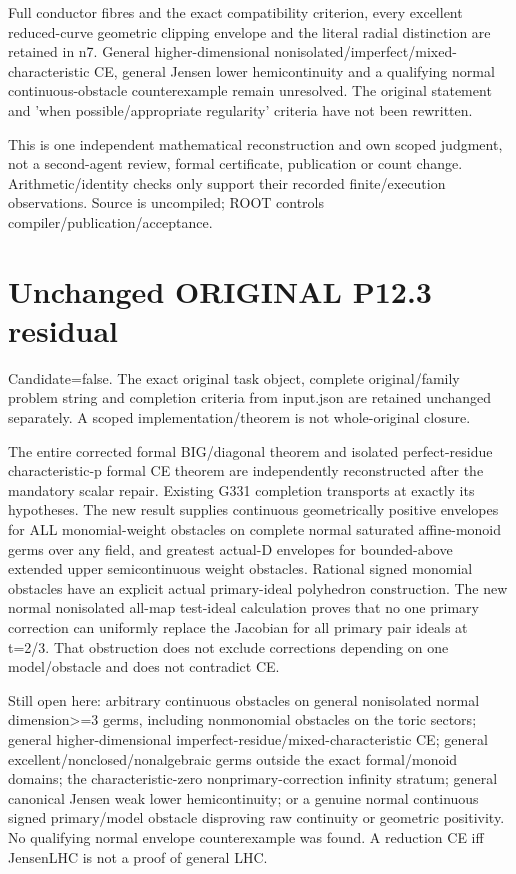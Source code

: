 \documentclass[11pt]{article}
\begin{document}
Full conductor fibres and the exact compatibility criterion, every excellent reduced-curve geometric clipping envelope and the literal radial distinction are retained in n7. General higher-dimensional nonisolated/imperfect/mixed-characteristic CE, general Jensen lower hemicontinuity and a qualifying normal continuous-obstacle counterexample remain unresolved. The original statement and 'when possible/appropriate regularity' criteria have not been rewritten.

This is one independent mathematical reconstruction and own scoped judgment, not a second-agent review, formal certificate, publication or count change. Arithmetic/identity checks only support their recorded finite/execution observations. Source is uncompiled; ROOT controls compiler/publication/acceptance.
\section{Unchanged ORIGINAL P12.3 residual}

Candidate=false. The exact original task object, complete original/family problem string and completion criteria from input.json are retained unchanged separately. A scoped implementation/theorem is not whole-original closure.

The entire corrected formal BIG/diagonal theorem and isolated perfect-residue characteristic-p formal CE theorem are independently reconstructed after the mandatory scalar repair. Existing G331 completion transports at exactly its hypotheses. The new result supplies continuous geometrically positive envelopes for ALL monomial-weight obstacles on complete normal saturated affine-monoid germs over any field, and greatest actual-D envelopes for bounded-above extended upper semicontinuous weight obstacles. Rational signed monomial obstacles have an explicit actual primary-ideal polyhedron construction. The new normal nonisolated all-map test-ideal calculation proves that no one primary correction can uniformly replace the Jacobian for all primary pair ideals at t=2/3. That obstruction does not exclude corrections depending on one model/obstacle and does not contradict CE.

Still open here: arbitrary continuous obstacles on general nonisolated normal dimension>=3 germs, including nonmonomial obstacles on the toric sectors; general higher-dimensional imperfect-residue/mixed-characteristic CE; general excellent/nonclosed/nonalgebraic germs outside the exact formal/monoid domains; the characteristic-zero nonprimary-correction infinity stratum; general canonical Jensen weak lower hemicontinuity; or a genuine normal continuous signed primary/model obstacle disproving raw continuity or geometric positivity. No qualifying normal envelope counterexample was found. A reduction CE iff JensenLHC is not a proof of general LHC.
\end{document}
